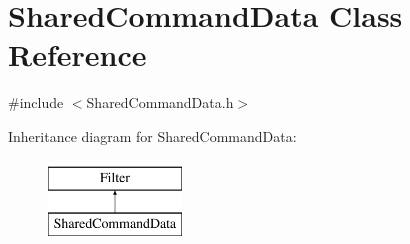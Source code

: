 \hypertarget{class_shared_command_data}{\section{Shared\+Command\+Data Class Reference}
\label{class_shared_command_data}
}


{\ttfamily \#include $<$Shared\+Command\+Data.\+h$>$}

Inheritance diagram for Shared\+Command\+Data\+:\begin{figure}[H]
\begin{center}
\leavevmode
\includegraphics[height=2.000000cm]{class_shared_command_data}
\end{center}
\end{figure}
